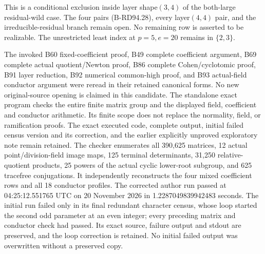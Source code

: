 \begin{remark}
\label{rem:B-RD94-scope}
This is a conditional exclusion inside layer shape$(3,4)$ of the
both-large residual-wild case. The four pairs (B-RD94.28), every
layer$(4,4)$ pair, and the irreducible-residual branch remain open.
No remaining row is asserted to be realizable. The unrestricted
least index at $p=5,e=20$ remains in $\{2,3\}$.

The invoked B60 fixed-coefficient proof, B49 complete coefficient
argument, B69 complete actual quotient/Newton proof, B86 complete
Cohen/cyclotomic proof, B91 layer reduction, B92 numerical
common-high proof, and B93 actual-field conductor argument were
reread in their retained canonical forms.
No new original-source opening is claimed in this candidate.
The standalone exact program
checks the entire finite matrix group and the displayed field,
coefficient and conductor arithmetic. Its finite scope does not
replace the normality, field, or ramification proofs. The exact
executed code, complete output, initial failed census version and
its correction, and the earlier explicitly unproved exploratory
note remain retained. The checker enumerates all 390,625 matrices,
12 actual point/division-field image maps, 125 terminal determinants,
31,250 relative-quotient products, 25 powers of the actual cyclic
lower-root subgroup, and 625 tracefree conjugations. It independently
reconstructs the four mixed coefficient rows and all 18 conductor
profiles. The corrected author run passed at 04:25:12.551765 UTC
on 20 November 2026 in 1.2287049839942483 seconds. The initial run
failed only in its final redundant character census, whose loop
started the second odd parameter at an even integer; every preceding
matrix and conductor check had passed. Its exact source, failure
output and stdout are preserved, and the loop correction is retained.
No initial failed output was overwritten without a preserved copy.
\end{remark}
